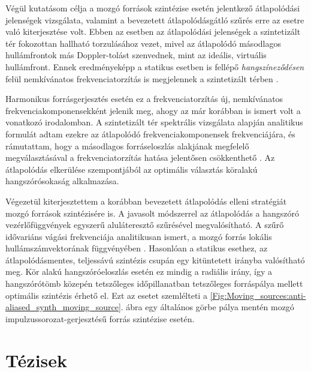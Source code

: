 \documentclass[10pt,twoside]{article}
\theoremstyle{thesisgroupstyle}
\theoremstyle{indented}
\begin{document}
Végül kutatásom célja a mozgó források szintézise esetén jelentkező átlapolódási jelenségek vizsgálata, valamint a bevezetett átlapolódásgátló szűrés erre az esetre való kiterjesztése volt.
Ebben az esetben az átlapolódási jelenségek a szintetizált tér fokozottan hallható torzulásához vezet, mivel az átlapolódó másodlagos hullámfrontok más Doppler-tolást szenvednek, mint az ideális, virtuális hullámfront.
Ennek eredményeképp a statikus esetben is fellépő \emph{hangszíneződésen} felül nemkívánatos frekvenciatorzítás is megjelennek a szintetizált térben \cite{firtha2016:daga_booklet}.

Harmonikus forrásgerjesztés esetén ez a frekvenciatorzítás új, nemkívánatos frekvenciakomponensekként jelenik meg, ahogy az már korábban is ismert volt a vonatkozó irodalomban.
A szintetizált tér spektrális vizsgálata alapján analitikus formulát adtam ezekre az átlapolódó frekvenciakomponensek frekvenciájára, és rámutattam, hogy a másodlagos forráseloszlás alakjának megfelelő megválasztásával a frekvenciatorzítás hatása jelentősen csökkenthető \cite{firtha2016:daga_booklet}.
Az átlapolódás elkerülése szempontjából az optimális választás köralakú hangszórósokaság alkalmazása.

Végezetül kiterjesztettem a korábban bevezetett átlapolódás elleni stratégiát mozgó források szintézisére is.
A javasolt módszerrel az átlapolódás a hangszóró vezérlőfüggvények egyszerű aluláteresztő szűrésével megvalósítható.
A szűrő idővariáns vágási frekvenciája analitikusan ismert, a mozgó forrás lokális hullámszámvektorának függvényében \cite{Firtha2018_daga_moving_source_booklet}.
Hasonlóan a statikus esethez, az átlapolódásmentes, teljessávú szintézis csupán egy kitüntetett irányba valósítható meg.
Kör alakú hangszóróeloszlás esetén ez mindig a radiális irány, így a hangszórótömb közepén tetszőleges időpillanatban tetszőleges forráspálya mellett optimális szintézis érhető el.
Ezt az esetet szemlélteti a \ref{Fig:Moving_sources:anti-aliased_synth_moving_source}. ábra egy általános görbe pálya mentén mozgó impulzussorozat-gerjesztésű forrás szintézise esetén.

\clearpage	
\section{Tézisek}
\label{sec:theses}
\end{document}
